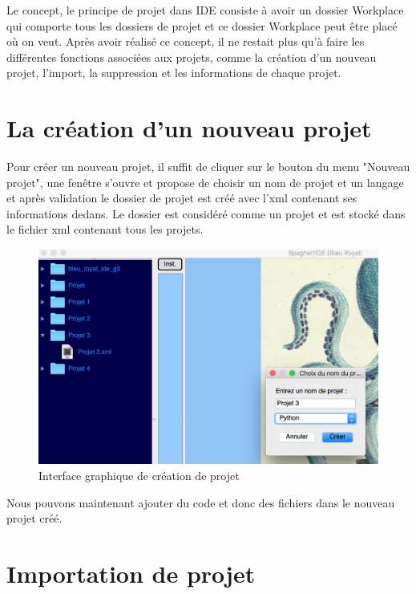 \documentclass[a4paper,12pt]{article}
\begin{document}
Le concept, le principe de projet dans IDE consiste à avoir un dossier Workplace qui comporte tous les dossiers de projet et ce dossier Workplace peut être placé où on veut. Après avoir réalisé ce concept, il ne restait plus qu'à faire les différentes fonctions associées aux projets, comme la création d'un nouveau projet, l'import, la suppression et les informations de chaque projet.
	
\section{La création d'un nouveau projet}
		
Pour créer un nouveau projet, il suffit de cliquer sur le bouton du menu "Nouveau projet", une fenêtre s'ouvre et propose de choisir un nom de projet et un langage et après validation le dossier de projet est créé avec l'xml contenant ses informations dedans. Le dossier est considéré comme un projet et est stocké dans le fichier xml contenant tous les projets.

\begin{figure}[h!]
			\begin{center}
				\includegraphics[scale=0.6]{images/creation_project.png}
				\caption{Interface graphique de création de projet}
			\end{center}
		\end{figure}

Nous pouvons maintenant ajouter du code et donc des fichiers dans le nouveau projet créé.

\section{Importation de projet}
\end{document}
